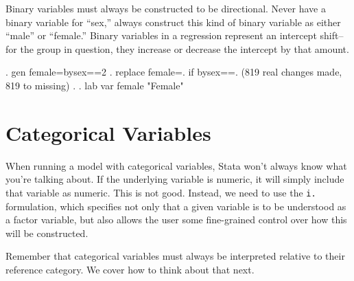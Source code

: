 \documentclass[12 pt]{article}
\begin{document}
Binary variables must always be constructed to be directional. Never
have a binary variable for ``sex,'' always construct this kind of
binary variable as either ``male'' or ``female.'' Binary variables in
a regression represent an intercept shift-- for the group in question,
they increase or decrease the intercept by that amount.  

\begin{stlog}

. gen female=bysex==2
. replace female=. if bysex==.
(819 real changes made, 819 to missing)
. 
. lab var female "Female"

\end{stlog}


\section{Categorical Variables}

When running a model with categorical variables, Stata won't always
know what you're talking about. If the underlying variable is numeric,
it will simply include that variable as numeric. This is not
good. Instead, we need to use the \texttt{i.} formulation, which
specifies not only that a given variable is to be understood as a
factor variable, but also allows the user some fine-grained control
over how this will be constructed. 

Remember that categorical variables must always be interpreted
relative to their reference category. We cover how to think about that
next. 
\end{document}
